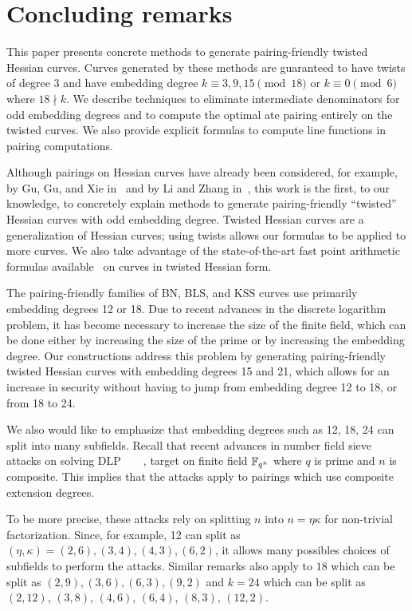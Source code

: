 \section{Concluding remarks}
\label{sec:conclude}

This paper presents concrete methods to generate pairing-friendly twisted Hessian curves.
Curves generated by these methods are guaranteed to have twists of degree $3$
and have embedding degree
$k \equiv 3,9,15 \pmod{18}$ or
$k \equiv 0 \pmod{6}$ where $18 \nmid k$.
We describe techniques to eliminate intermediate denominators for odd embedding degrees
and to compute the optimal ate pairing entirely on the twisted curves.
We also provide explicit formulas to compute line functions in pairing computations.

Although pairings on Hessian curves have already been considered,
for example, by Gu, Gu, and Xie in~\cite{2010/Gu} and by Li and Zhang in~\cite{2012/Li},
this work is the first, to our knowledge, to concretely explain methods to generate
pairing-friendly ``twisted'' Hessian curves with odd embedding degree.
Twisted Hessian curves are a generalization of Hessian curves; using twists allows our formulas to be applied to more curves.
We also take advantage of the state-of-the-art fast point arithmetic formulas available~\cite{2015/hessian}
on curves in twisted Hessian form.

The pairing-friendly families of BN, BLS, and KSS curves use primarily embedding degrees 12 or 18.
Due to recent advances in the discrete logarithm problem, it has become necessary to increase the size of the finite field,
which can be done either by increasing the size of the prime or by increasing the embedding degree.
Our constructions address this problem by generating pairing-friendly twisted Hessian curves with embedding degrees 15 and 21,
which allows for an increase in security without having to jump from embedding degree 12 to 18, or from 18 to 24.

We also would like to emphasize that embedding degrees such as 12, 18, 24 can split into many subfields.
Recall that recent advances in number field sieve attacks on solving DLP~\cite{2016/conjugate}~\cite{2016/SS}~\cite{2016/KB}~\cite{2017/KJ},
target on finite field $\mathbb{F}_{q^n}$ where $q$ is prime and $n$ is composite.
This implies that the attacks apply to pairings which use composite extension degrees.

To be more precise, these attacks rely on splitting $n$ into $n = \eta \kappa$ for non-trivial factorization.
Since, for example, 12 can split as $(\eta,\kappa) = (2,6), (3,4), (4,3), (6,2)$,
it allows many possibles choices of subfields to perform the attacks.
Similar remarks also apply to
$18$ which can be split as $(2,9), (3,6), (6,3), (9,2)$
and
$k = 24$ which can be split as $(2,12)$, $(3,8)$, $(4,6)$, $(6,4)$, $(8,3)$, $(12,2)$.

